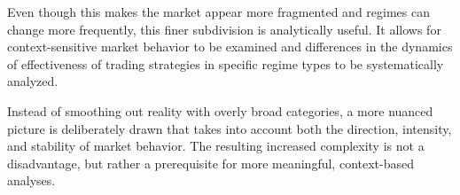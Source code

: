 Even though this makes the market appear more fragmented and regimes can change more frequently, this finer subdivision is analytically useful.
It allows for context-sensitive market behavior to be examined and differences in the dynamics of effectiveness of trading strategies in specific regime types to be systematically analyzed.

Instead of smoothing out reality with overly broad categories, a more nuanced picture is deliberately drawn that takes into account both the direction, intensity, and stability of market behavior.
The resulting increased complexity is not a disadvantage, but rather a prerequisite for more meaningful, context-based analyses.
